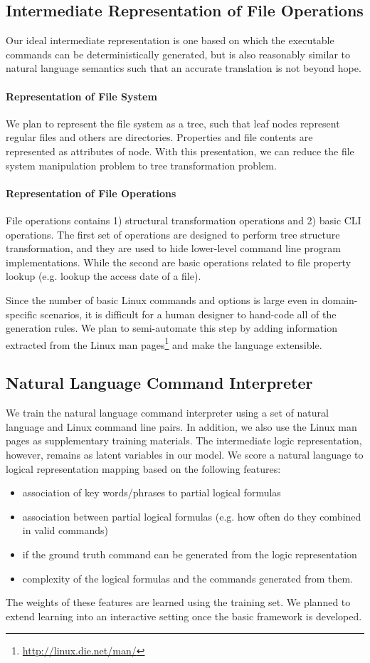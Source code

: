 \subsection{Intermediate Representation of File Operations}
\label{subsec:represent}
Our ideal intermediate representation is one based on which the executable commands can be deterministically generated, but is also reasonably similar to natural language semantics such that an accurate translation is not beyond hope.
\paragraph{Representation of File System}
We plan to represent the file system as a tree, such that leaf nodes represent regular files and others are directories. Properties and file contents are represented as attributes of node. With this presentation, we can reduce the file system manipulation problem to tree transformation problem.
\paragraph{Representation of File Operations}
File operations contains 1) structural transformation operations and 2) basic CLI operations. The first set of operations are designed to perform tree structure transformation, and they are used to hide lower-level command line program implementations. While the second are basic operations related to file property lookup (e.g. lookup the access date of a file).

Since the number of basic Linux commands and options is large even in domain-specific scenarios, it is difficult for a human designer to hand-code all of the generation rules. We plan to semi-automate this step by adding information extracted from the Linux man pages\footnote{\url{http://linux.die.net/man/}} and make the language extensible.

\subsection{Natural Language Command Interpreter}
We train the natural language command interpreter using a set of natural language and Linux command line pairs. In addition, we also use the Linux man pages as supplementary training materials. The intermediate logic representation, however, remains as latent variables in our model. We score a natural language to logical representation mapping based on the following features:
\begin{itemize}\itemsep-1pt
	\item association of key words/phrases to partial logical formulas
	\item association between partial logical formulas (e.g. how often do they combined in valid commands)
	\item if the ground truth command can be generated from the logic representation
	\item complexity of the logical formulas and the commands generated from them.
\end{itemize}
The weights of these features are learned using the training set. We planned to extend learning into an interactive setting once the basic framework is developed.